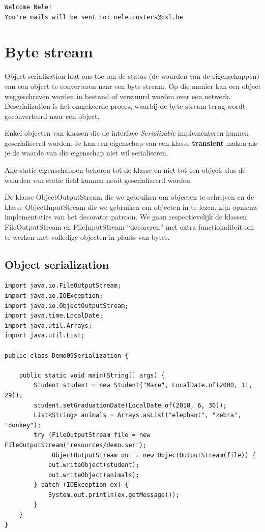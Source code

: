 \begin{verbatim}
Welcome Nele!
You're mails will be sent to: nele.custers@pxl.be
\end{verbatim}


\section{Byte stream}

Object serialization laat ons toe om de status (de waarden van de eigenschappen) van een object te converteren naar een byte stream. Op die manier kan een object weggeschreven worden in bestand of verstuurd worden over een netwerk.
Deserialization is het omgekeerde proces, waarbij de byte stream terug wordt geconverteerd naar een object.

Enkel objecten van klassen die de interface \textit{Serializable} implementeren kunnen geserialiseerd worden.
Je kan een eigenschap van een klasse \textbf{transient} maken als je de waarde van die eigenschap niet wil serialiseren.

Alle static eigenschappen behoren tot de klasse en niet tot een object, dus de waarden van static field kunnen nooit geserialiseerd worden. 

De klasse ObjectOutputStream die we gebruiken om objecten te schrijven en de klasse ObjectInputStream die we gebruiken om objecten in te lezen, zijn opnieuw implementaties van het decorator patroon. We gaan respectievelijk de klassen FileOutputStream en FileInputStream ``decoreren'' met extra functionaliteit om te werken met volledige objecten in plaats van bytes. 

\subsection{Object serialization}

\begin{lstlisting}
import java.io.FileOutputStream;
import java.io.IOException;
import java.io.ObjectOutputStream;
import java.time.LocalDate;
import java.util.Arrays;
import java.util.List;

public class Demo09Serialization {

	public static void main(String[] args) {
		Student student = new Student("Mare", LocalDate.of(2000, 11, 29));
		student.setGraduationDate(LocalDate.of(2018, 6, 30));
		List<String> animals = Arrays.asList("elephant", "zebra", "donkey");
		try (FileOutputStream file = new FileOutputStream("resources/demo.ser");
		     ObjectOutputStream out = new ObjectOutputStream(file)) {
			out.writeObject(student);
			out.writeObject(animals);
		} catch (IOException ex) {
			System.out.println(ex.getMessage());
		}
	}
}
\end{lstlisting}



